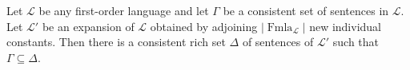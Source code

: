 Let $\mathcal{L}$ be any first-order language and let $\Gamma$ be a consistent set of sentences in $\mathcal{L}$. Let $\mathcal{L}'$ be an expansion of $\mathcal{L}$ obtained by adjoining $|\operatorname{Fmla}_{\mathcal{L}}|$ new individual constants. Then there is a consistent rich set $\Delta$ of sentences of $\mathcal{L}'$ such that $\Gamma \subseteq \Delta$.
